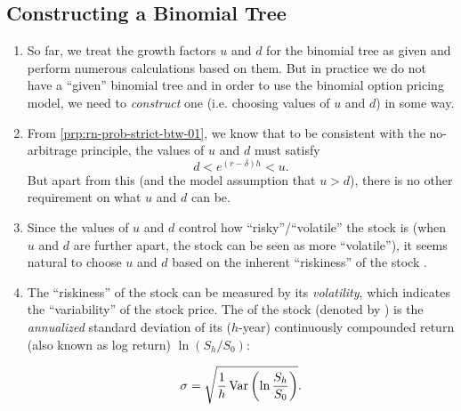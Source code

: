 \subsection{Constructing a Binomial Tree}
\begin{enumerate}
\item So far, we treat the growth factors \(u\) and \(d\) for the binomial tree
as given and perform numerous calculations based on them. But in practice we do
not have a ``given'' binomial tree and in order to use the binomial option
pricing model, we need to \emph{construct} one (i.e. choosing values of \(u\)
and \(d\)) in some way.

\item \label{it:tree-ud-bounds}
From \cref{prp:rn-prob-strict-btw-01}, we know that to be consistent with
the no-arbitrage principle, the values of \(u\) and \(d\) must satisfy
\[
d<e^{(r-\delta)h}<u.
\]
But apart from this (and the model assumption that \(u>d\)), there is no other
requirement on what \(u\) and \(d\) can be.

\item Since the values of \(u\) and \(d\) control how ``risky''/``volatile'' the stock
 is (when \(u\) and \(d\) are further apart, the stock
 can be seen as more ``volatile''), it seems natural to
choose \(u\) and \(d\) based on the inherent ``riskiness'' of the stock
.

\item \label{it:volatility}
The ``riskiness'' of the stock  can be measured by its
\emph{volatility}, which indicates the ``variability'' of the stock price. The
 of the stock  (denoted by
) is the \emph{annualized} standard deviation of its
(\(h\)-year) continuously compounded return (also known as log return) \(\ln
(S_h/S_0)\):

\[
\sigma=\sqrt{\frac{1}{h}\operatorname{Var}\qty(\ln\frac{S_h}{S_0})}.
\]
\end{enumerate}

